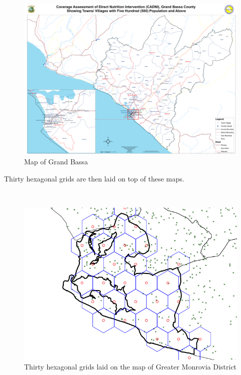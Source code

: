 \documentclass[12pt,a4paper]{book}
\theoremstyle{definition}
\theoremstyle{definition}
\theoremstyle{definition}
\theoremstyle{remark}
\begin{document}
~

\begin{figure}[H]

{\centering \includegraphics[width=0.8\linewidth]{figures/grandBassaEA} 

}

\caption{Map of Grand Bassa}\label{fig:sample21}
\end{figure}

\newpage

Thirty hexagonal grids are then laid on top of these maps.

~

\begin{figure}[H]

{\centering \includegraphics{figures/sample22-1} 

}

\caption{Thirty hexagonal grids laid on the  map of Greater Monrovia District}\label{fig:sample22}
\end{figure}
\end{document}
